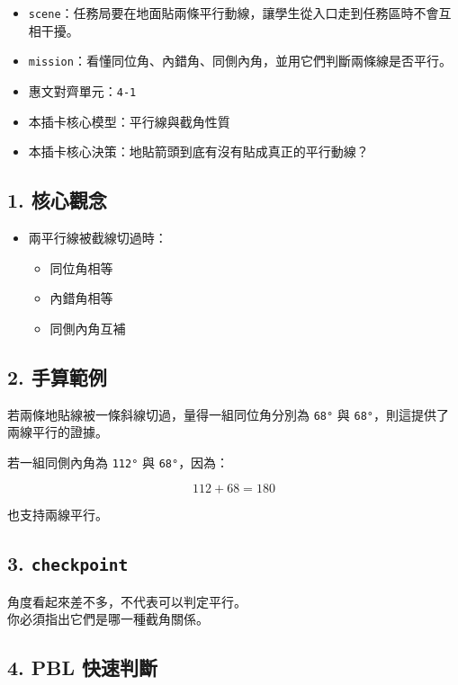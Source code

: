 \documentclass[
  chinese,
  12pt,
  a4paper,
  oneside]{article}
\providecommand{\tightlist}{%
  \setlength{\itemsep}{0pt}\setlength{\parskip}{0pt}}
\begin{document}
\begin{itemize}
\tightlist
\item
  \texttt{scene}：任務局要在地面貼兩條平行動線，讓學生從入口走到任務區時不會互相干擾。
\item
  \texttt{mission}：看懂同位角、內錯角、同側內角，並用它們判斷兩條線是否平行。
\item
  惠文對齊單元：\texttt{4-1}
\item
  本插卡核心模型：平行線與截角性質
\item
  本插卡核心決策：地貼箭頭到底有沒有貼成真正的平行動線？
\end{itemize}

\subsection{1. 核心觀念}\label{ux6838ux5fc3ux89c0ux5ff5-4}

\begin{itemize}
\tightlist
\item
  兩平行線被截線切過時：

  \begin{itemize}
  \tightlist
  \item
    同位角相等
  \item
    內錯角相等
  \item
    同側內角互補
  \end{itemize}
\end{itemize}

\subsection{2. 手算範例}\label{ux624bux7b97ux7bc4ux4f8b-7}

若兩條地貼線被一條斜線切過，量得一組同位角分別為 \texttt{68°} 與
\texttt{68°}，則這提供了兩線平行的證據。

若一組同側內角為 \texttt{112°} 與 \texttt{68°}，因為：

\[
112 + 68 = 180
\]

也支持兩線平行。

\subsection{\texorpdfstring{3.
\texttt{checkpoint}}{3. checkpoint}}\label{checkpoint-8}

角度看起來差不多，不代表可以判定平行。\\
你必須指出它們是哪一種截角關係。

\subsection{4. PBL 快速判斷}\label{pbl-ux5febux901fux5224ux65b7-4}
\end{document}
